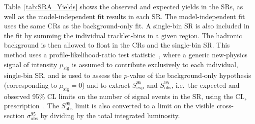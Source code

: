 Table~\ref{tab:SRA_Yields} shows the observed and expected yields in the SRs, as well as the model-independent fit results in each SR. The model-independent fit uses the same CRs as the background-only fit. A single-bin SR is also included in the fit by summing the individual tracklet-\pt bins in a given region. The hadronic background is then allowed to float in the CRs and the single-bin SR. This method uses a profile-likelihood-ratio test statistic~\cite{Cowan:2010js}, where a generic new-physics signal of intensity $\mu_{\mathrm{sig}}$ is assumed to contribute exclusively to each individual, single-bin SR, and is used to assess the $p$-value of the background-only hypothesis (corresponding to $\mu_{\mathrm{sig}} = 0$) and to extract $S^{95}_{\mathrm{exp}}$ and $S^{95}_{\mathrm{obs}}$, i.e.\ the expected and observed 95\% CL limits on the number of signal events in the SR, using the CL$_\mathrm{s}$ prescription~\cite{Read:2002hq}. The $S^{95}_{\mathrm{obs}}$ limit is also converted to a limit on the visible cross-section $\sigma_{\mathrm{obs}}^{95}$ by dividing by the total integrated luminosity. 

